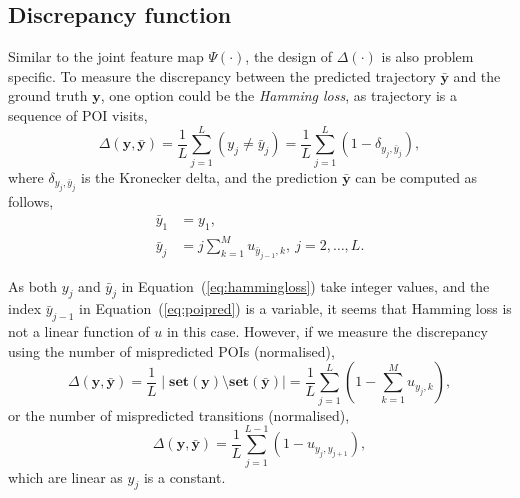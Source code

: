\documentclass[9pt]{extarticle}
\begin{document}
\subsection{Discrepancy function}
\label{sec:lossfunc}

Similar to the joint feature map $\Psi(\cdot)$, the design of $\Delta(\cdot)$ is also problem specific.
To measure the discrepancy between the predicted trajectory $\bar{\mathbf{y}}$ and the ground truth $\mathbf{y}$, 
one option could be the \emph{Hamming loss}, as trajectory is a sequence of POI visits, 
\begin{equation}
\label{eq:hammingloss}
\Delta(\mathbf{y}, \bar{\mathbf{y}}) = \frac{1}{L} \sum_{j=1}^L (y_j \neq \bar{y}_j) = \frac{1}{L} \sum_{j=1}^L \left(1 - \delta_{y_j, \bar{y}_j} \right),
\end{equation}
where $\delta_{y_j, \bar{y}_j}$ is the Kronecker delta,
and the prediction $\bar{\mathbf{y}}$ can be computed as follows,
\begin{align}
\bar{y}_1 &= y_1, \\
\bar{y}_j &= j \sum_{k=1}^M u_{\bar{y}_{j-1}, k},~ j=2,\dots,L.  \label{eq:poipred}
\end{align}

As both $y_j$ and $\bar{y}_j$ in Equation~(\ref{eq:hammingloss}) take integer values,
and the index $\bar{y}_{j-1}$ in Equation~(\ref{eq:poipred}) is a variable,
it seems that Hamming loss is not a linear function of $u$ in this case.
However, if we measure the discrepancy using the number of mispredicted POIs (normalised),
\begin{equation}
\Delta(\mathbf{y}, \bar{\mathbf{y}}) = \frac{1}{L} \mid \textbf{set}(\mathbf{y}) \setminus \textbf{set}(\bar{\mathbf{y}}) \mid 
                                     = \frac{1}{L} \sum_{j=1}^L \left( 1 - \sum_{k=1}^M u_{y_j, k} \right),
\end{equation}
or the number of mispredicted transitions (normalised),
\begin{equation}
\Delta(\mathbf{y}, \bar{\mathbf{y}}) = \frac{1}{L} \sum_{j=1}^{L-1} \left( 1 - u_{y_j, y_{j+1}} \right),
\end{equation}
which are linear as $y_j$ is a constant.
\end{document}
